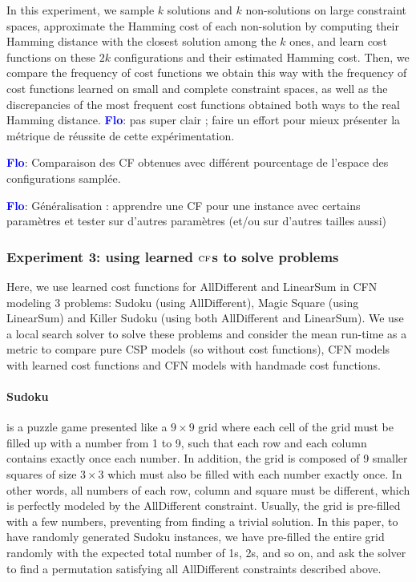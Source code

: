\documentclass{article}
\newcommand{\csp}{\textsc{CSP}\xspace}
\newcommand{\cfn}{\textsc{CFN}\xspace}
\newcommand{\cf}{\textsc{cf}\xspace}
\newcommand{\flo}{\textcolor{blue}{\bf Flo}\xspace}
\begin{document}
In this experiment,  we sample $k$ solutions and  $k$ non-solutions on
large  constraint  spaces,  approximate   the  Hamming  cost  of  each
non-solution  by computing  their  Hamming distance  with the  closest
solution among  the $k$ ones, and  learn cost functions on  these $2k$
configurations and their estimated Hamming  cost. Then, we compare the
frequency of cost  functions we obtain this way with  the frequency of
cost functions  learned on  small and  complete constraint  spaces, as
well as the discrepancies of the most frequent cost functions obtained
both ways to the real Hamming  distance. \flo: pas super clair ; faire
un  effort pour  mieux  présenter  la métrique  de  réussite de  cette
expérimentation. 

\flo: Comparaison des CF obtenues avec différent pourcentage de l'espace des
configurations samplée.

\flo: Généralisation  : apprendre  une CF  pour une  instance avec  certains
paramètres  et  tester sur  d'autres  paramètres  (et/ou sur  d'autres
tailles aussi)

\subsubsection{Experiment 3: using learned $\cf$s to solve problems}

Here, we use learned cost  functions for AllDifferent and LinearSum in
\cfn modeling  3 problems:  Sudoku (using AllDifferent),  Magic Square
(using  LinearSum)  and Killer  Sudoku  (using  both AllDifferent  and
LinearSum). We use  a local search solver to solve  these problems and
consider the mean run-time as a metric to compare pure \csp models (so
without cost functions),  \cfn models with learned  cost functions and
\cfn models with handmade cost functions.

\paragraph{Sudoku} is a puzzle game presented like a $9 \times 9$ grid
where each cell of the grid must be  filled up with a number from 1 to
9,  such that  each row  and each  column contains  exactly once  each
number. In addition, the grid is composed of 9 smaller squares of size
$3  \times 3$  which  must also  be filled  with  each number  exactly
once. In other words, all numbers  of each row, column and square must
be  different,   which  is  perfectly  modeled   by  the  AllDifferent
constraint.   Usually, the  grid  is pre-filled  with  a few  numbers,
preventing from  finding a trivial  solution.  In this paper,  to have
randomly  generated Sudoku  instances, we  have pre-filled  the entire
grid randomly with the expected total number of 1s, 2s, and so on, and
ask  the solver  to  find a  permutation  satisfying all  AllDifferent
constraints described above.
\end{document}

